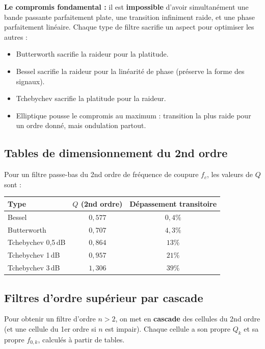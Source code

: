 \documentclass[12pt,a4paper,twoside]{book}
\begin{document}
\begin{intuition}
\textbf{Le compromis fondamental :} il est \textbf{impossible} d'avoir simultanément une bande passante parfaitement plate, une transition infiniment raide, et une phase parfaitement linéaire. Chaque type de filtre sacrifie un aspect pour optimiser les autres :
\begin{itemize}[nosep]
\item Butterworth sacrifie la raideur pour la platitude.
\item Bessel sacrifie la raideur pour la linéarité de phase (préserve la forme des signaux).
\item Tchebychev sacrifie la platitude pour la raideur.
\item Elliptique pousse le compromis au maximum : transition la plus raide pour un ordre donné, mais ondulation partout.
\end{itemize}
\end{intuition}

\subsection{Tables de dimensionnement du 2nd ordre}

Pour un filtre passe-bas du 2nd ordre de fréquence de coupure $f_c$, les valeurs de $Q$ sont :

\begin{center}
\begin{tabular}{lcc}
\toprule
\textbf{Type} & \textbf{$Q$ (2nd ordre)} & \textbf{Dépassement transitoire} \\
\midrule
Bessel & $0{,}577$ & $0{,}4\%$ \\
Butterworth & $0{,}707$ & $4{,}3\%$ \\
Tchebychev 0,5\,dB & $0{,}864$ & $13\%$ \\
Tchebychev 1\,dB & $0{,}957$ & $21\%$ \\
Tchebychev 3\,dB & $1{,}306$ & $39\%$ \\
\bottomrule
\end{tabular}
\end{center}

\subsection{Filtres d'ordre supérieur par cascade}

Pour obtenir un filtre d'ordre $n > 2$, on met en \textbf{cascade} des cellules du 2nd ordre (et une cellule du 1er ordre si $n$ est impair). Chaque cellule a son propre $Q_k$ et sa propre $f_{0,k}$, calculés à partir de tables.
\end{document}
